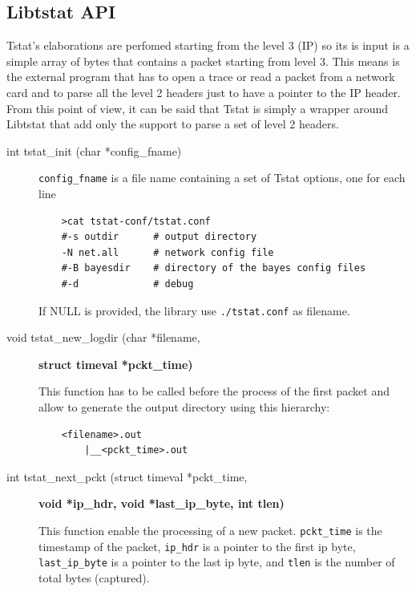 \documentclass[11pt]{article}
\begin{document}
\subsection{Libtstat API\label{Libtstat_API}}


Tstat's elaborations are perfomed starting from the level 3 (IP) so
its is input is a simple array of bytes that contains a packet
starting from level 3. This means is the external program that
has to open a trace or read a packet from a network card and to
parse all the level 2 headers just to have a pointer to the IP header.
From this point of view, it can be said that Tstat is simply a wrapper
around Libtstat that add only the support to parse a set of level 2
headers.

\begin{description}

\item[{int tstat\_init (char *config\_fname)}] \mbox{}

\texttt{config\_fname} is a file name containing a set of Tstat options, one 
for each line

\begin{small}\begin{verbatim}
    >cat tstat-conf/tstat.conf
    #-s outdir      # output directory
    -N net.all      # network config file 
    #-B bayesdir    # directory of the bayes config files
    #-d             # debug
\end{verbatim}\end{small} \noindent
If NULL is provided, the library use \texttt{./tstat.conf} as filename.


\item[{void tstat\_new\_logdir (char *filename,}] \textbf{struct timeval *pckt\_time)}

This function has to be called before the process of the first packet
and allow to generate the output directory using this hierarchy:

\begin{small}\begin{verbatim}
    <filename>.out
        |__<pckt_time>.out
\end{verbatim}\end{small} \noindent
\item[{int tstat\_next\_pckt (struct timeval *pckt\_time,}] \textbf{void *ip\_hdr, void *last\_ip\_byte, int tlen)}

This function enable the processing of a new packet.
\texttt{pckt\_time}  is the timestamp of the packet, \texttt{ip\_hdr} is a pointer to the first ip byte,
\texttt{last\_ip\_byte} is a pointer to the last ip byte, and \texttt{tlen} is the number of total bytes (captured).



\end{description}
\end{document}

